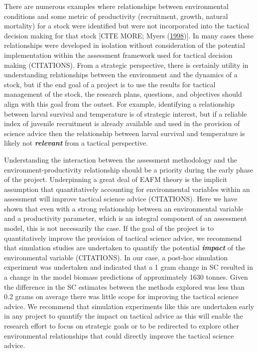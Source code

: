 \documentclass[
]{article}
\begin{document}
There are numerous examples where relationships between environmental conditions and some metric of productivity (recruitment, growth, natural mortality) for a stock were identified but were not incorporated into the tactical decision making for that stock {[}CITE MORE; Myers (\protect\hyperlink{ref-myersWhenEnvironmentRecruitment1998}{1998}){]}. In many cases these relationships were developed in isolation without consideration of the potential implementation within the assessment framework used for tactical decision making (CITATIONS). From a strategic perspective, there is certainly utility in understanding relationships between the environment and the dynamics of a stock, but if the end goal of a project is to use the results for tactical management of the stock, the research plans, questions, and objectives should align with this goal from the outset. For example, identifying a relationship between larval survival and temperature is of strategic interest, but if a reliable index of juvenile recruitment is already available and used in the provision of science advice then the relationship between larval survival and temperature is likely not \textbf{\emph{relevant}} from a tactical perspective.

Understanding the interaction between the assessment methodology and the environment-productivity relationship should be a priority during the early phase of the project. Underpinning a great deal of EAFM theory is the implicit assumption that quantitatively accounting for environmental variables within an assessment will improve tactical science advice (CITATIONS). Here we have shown that even with a strong relationship between an environmental variable and a productivity parameter, which is an integral component of an assessment model, this is not necessarily the case. If the goal of the project is to quantitatively improve the provision of tactical science advice, we recommend that simulation studies are undertaken to quantify the potential \textbf{\emph{impact}} of the environmental variable (CITATIONS). In our case, a post-hoc simulation experiment was undertaken and indicated that a 1 gram change in SC resulted in a change in the model biomass predictions of approximately 1630 tonnes. Given the difference in the SC estimates between the methods explored was less than 0.2 grams on average there was little scope for improving the tactical science advice. We recommend that simulation experiments like this are undertaken early in any project to quantify the impact on tactical advice as this will enable the research effort to focus on strategic goals or to be redirected to explore other environmental relationships that could directly improve the tactical science advice.
\end{document}
